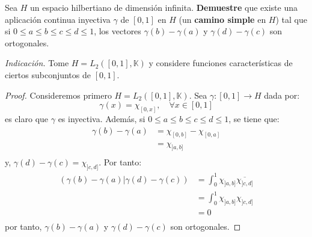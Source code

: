 \documentclass[12pt]{report}
\theoremstyle{largebreak}
\newcommand\cf[3]{\ensuremath{#1:#2\rightarrow#3}}
\newcommand\pint[2]{\ensuremath{\left(#1\big|#2\right)}}
\newcommand\conj[1]{\ensuremath{\overline{#1}}}
\begin{document}
    \begin{excer}
        Sea $H$ un espacio hilbertiano de dimensión infinita. \textbf{Demuestre} que existe una aplicación continua inyectiva $\gamma$ de $[0,1]$ en $H$ (un \textbf{camino simple} en $H$) tal que si $0\leq a\leq b\leq c\leq d\leq 1$, los vectores $\gamma(b)-\gamma(a)$ y $\gamma(d)-\gamma(c)$ son ortogonales.

        \textit{Indicación.} Tome $H=L_2([0,1],\mathbb{K})$ y considere funciones características de ciertos subconjuntos de $[0,1]$.
    \end{excer}

    \begin{proof}
        Consideremos primero $H=L_2([0,1],\mathbb{K})$. Sea $\cf{\gamma}{[0,1]}{H}$ dada por:
        \begin{equation*}
            \gamma(x)=\chi_{[0,x]},\quad\forall x\in[0,1]
        \end{equation*}
        es claro que $\gamma$ es inyectiva. Además, si $0\leq a\leq b\leq c\leq d\leq 1$, se tiene que:
        \begin{equation*}
            \begin{split}
                \gamma(b)-\gamma(a)&=\chi_{[0,b]}-\chi_{[0,a]}\\
                &=\chi_{]a,b]}\\
            \end{split}
        \end{equation*}
        y, $\gamma(d)-\gamma(c)=\chi_{]c,d]}$. Por tanto:
        \begin{equation*}
            \begin{split}
                \pint{\gamma(b)-\gamma(a)}{\gamma(d)-\gamma(c)}&=\int_{0}^{1}\chi_{]a,b]}\conj{\chi_{]c,d]}}\\
                &=\int_{0}^{1}\chi_{]a,b]}\chi_{]c,d]}\\
                &=0\\
            \end{split}
        \end{equation*}
        por tanto, $\gamma(b)-\gamma(a)$ y $\gamma(d)-\gamma(c)$ son ortogonales.
    \end{proof}
\end{document}
